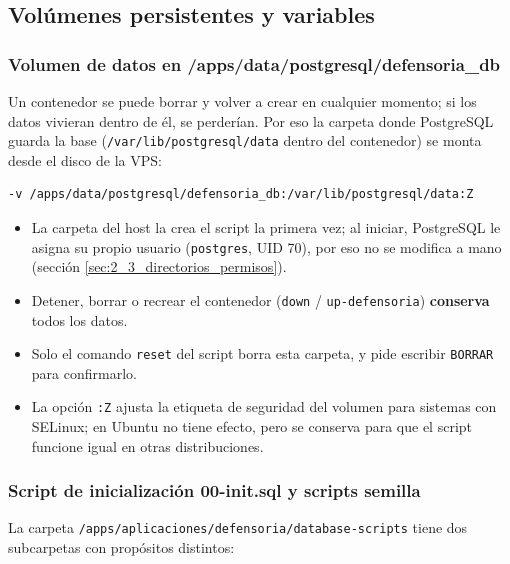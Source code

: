 \subsection{Volúmenes persistentes y variables}\label{sec:5_2_volumenes_variables}

\subsubsection{Volumen de datos en /apps/data/postgresql/defensoria\_db}
Un contenedor se puede borrar y volver a crear en cualquier momento; si los datos vivieran dentro de él, se perderían. Por eso la carpeta donde PostgreSQL guarda la base (\texttt{/var/lib/postgresql/data} dentro del contenedor) se monta desde el disco de la VPS:
\begin{lstlisting}
-v /apps/data/postgresql/defensoria_db:/var/lib/postgresql/data:Z
\end{lstlisting}
\begin{itemize}
  \item La carpeta del host la crea el script la primera vez; al iniciar, PostgreSQL le asigna su propio usuario (\texttt{postgres}, UID 70), por eso no se modifica a mano (sección \ref{sec:2_3_directorios_permisos}).
  \item Detener, borrar o recrear el contenedor (\texttt{down} / \texttt{up-defensoria}) \textbf{conserva} todos los datos.
  \item Solo el comando \texttt{reset} del script borra esta carpeta, y pide escribir \texttt{BORRAR} para confirmarlo.
  \item La opción \texttt{:Z} ajusta la etiqueta de seguridad del volumen para sistemas con SELinux; en Ubuntu no tiene efecto, pero se conserva para que el script funcione igual en otras distribuciones.
\end{itemize}

\subsubsection{Script de inicialización 00-init.sql y scripts semilla}
La carpeta \nolinkurl{/apps/aplicaciones/defensoria/database-scripts} tiene dos subcarpetas con propósitos distintos:

